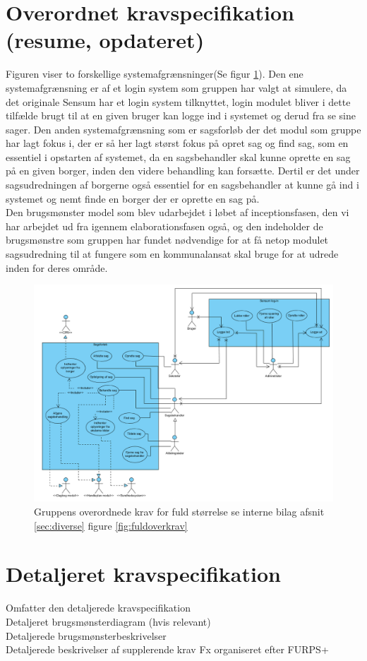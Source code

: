 \section{Overordnet kravspecifikation (resume, opdateret)}
Figuren viser to forskellige systemafgrænsninger(Se figur \ref{fig:overkrav}). Den ene systemafgrænsning er af et login system som gruppen har valgt at simulere, da det originale Sensum har et login system tilknyttet, login modulet bliver i dette tilfælde brugt til at en given bruger kan logge ind i systemet og derud fra se sine sager. Den anden systemafgrænsning som er sagsforløb der det modul som gruppe har lagt fokus i, der er så her lagt størst fokus på opret sag og find sag, som en essentiel i opstarten af systemet, da en sagsbehandler skal kunne oprette en sag på en given borger, inden den videre behandling kan forsætte. Dertil er det under sagsudredningen af borgerne også essentiel for en sagsbehandler at kunne gå ind i systemet og nemt finde en borger der er oprette en sag på.\\
Den brugsmønster model som blev udarbejdet i løbet af inceptionsfasen, den vi har arbejdet ud fra igennem elaborationsfasen også, og den indeholder de brugsmønstre som gruppen har fundet nødvendige for at få netop modulet sagsudredning til at fungere som en kommunalansat skal bruge for at udrede inden for deres område. 
\begin{figure}[h]
  \includegraphics[scale = 0.4]{./PNG/krav/overkrav.PNG} 
  \caption{Gruppens overordnede krav for fuld størrelse se interne bilag afsnit \ref{sec:diverse} figure \ref{fig:fuldoverkrav}}
  \label{fig:overkrav}
\end{figure}

\section{Detaljeret kravspecifikation}
Omfatter den detaljerede kravspecifikation\\
Detaljeret brugsmønsterdiagram (hvis relevant)\\
Detaljerede brugsmønsterbeskrivelser\\
Detaljerede beskrivelser af supplerende krav Fx organiseret efter FURPS+\\




